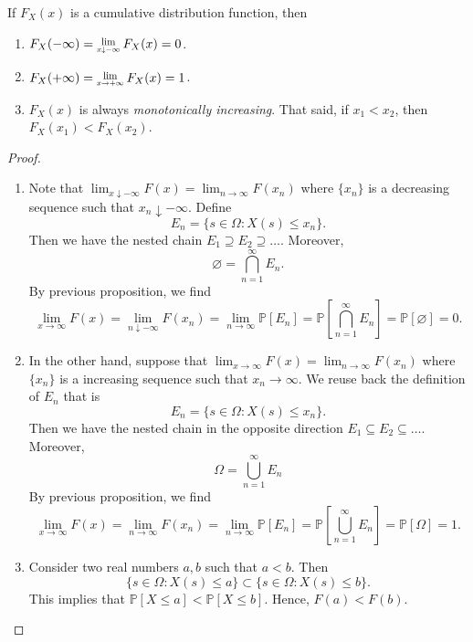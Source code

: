 \begin{theorem}
    If $F_X(x)$ is a cumulative distribution function, then
    \begin{enumerate}
        \item $F_X(-\infty) = \Lim{x \downarrow -\infty} F_X(x) = 0$.
        \item $F_X(+\infty) = \Lim{x \to +\infty} F_X(x) = 1$.
        \item $F_X(x)$ is always \textit{monotonically increasing}. That said, if $x_1 < x_2$, then 
            $F_X(x_1) < F_X(x_2)$.
    \end{enumerate}
\end{theorem}
\begin{proof}
    \begin{enumerate}
        \item Note that $\lim_{x \downarrow -\infty} F(x) = \lim_{n \to \infty}F(x_n)$ where $\{x_n \}$ 
            is a decreasing sequence such that $x_n \downarrow -\infty$. Define
            \[
                E_n = \{ s \in \Omega: X(s) \leq x_n \}.
            \]
            Then we have the nested chain $E_1 \supseteq E_2 \supseteq \ldots$. Moreover,
            \[
                \varnothing = \bigcap^\infty_{n=1} E_n.
            \]
            By previous proposition, we find 
            \[
                \lim_{x \to \infty} F(x) = \lim_{n \downarrow -\infty} F(x_n) = 
                \lim_{n \to \infty} \mathbb{P}[E_n] 
                = \mathbb{P} \left[ \bigcap^\infty_{n=1} E_n \right] = \mathbb{P}[\varnothing] = 0.
            \]
        
        \item In the other hand, suppose that $\lim_{x \to \infty} F(x) = \lim_{n \to \infty}F(x_n)$ where $\{x_n \}$ 
            is a increasing sequence such that $x_n \to \infty$. We reuse back the definition of $E_n$ that is
            \[
                E_n = \{ s \in \Omega: X(s) \leq x_n \}.
            \]
            Then we have the nested chain in the opposite direction $E_1 \subseteq E_2 \subseteq \ldots$. Moreover,
            \[
                \Omega = \bigcup^\infty_{n=1} E_n
            \]
            By previous proposition, we find 
            \[
                \lim_{x \to \infty} F(x) = \lim_{n \to \infty} F(x_n) = 
                \lim_{n \to \infty} \mathbb{P}[E_n] 
                = \mathbb{P} \left[ \bigcup^\infty_{n=1} E_n \right] = \mathbb{P}[\Omega] = 1.
            \]
        
        \item Consider two real numbers $a,b$ such that $a < b$. Then 
        \[
            \{ s \in \Omega: X(s) \leq a \} \subset \{ s \in \Omega: X(s) \leq b \}.
        \]
        This implies that $\mathbb{P}[X \leq a] < \mathbb{P}[X \leq b]$. Hence, $F(a) < F(b)$.
    \end{enumerate}
\end{proof}

